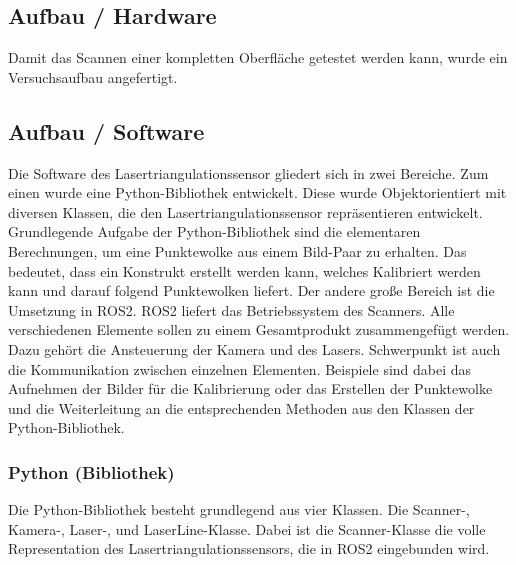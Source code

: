 	\newpage
	
	\subsection{Aufbau / Hardware}
	Damit das Scannen einer kompletten Oberfläche getestet werden kann, wurde ein Versuchsaufbau angefertigt.
	
	\label{chap:aufbau_hardware}
	
	\newpage
	
	\subsection{Aufbau / Software}
	Die Software des Lasertriangulationssensor gliedert sich in zwei Bereiche. Zum einen wurde eine Python-Bibliothek entwickelt. Diese wurde Objektorientiert mit diversen Klassen, die den Lasertriangulationssensor repräsentieren entwickelt. Grundlegende Aufgabe der Python-Bibliothek sind die elementaren Berechnungen, um eine Punktewolke aus einem Bild-Paar zu erhalten. Das bedeutet, dass ein Konstrukt erstellt werden kann, welches Kalibriert werden kann und darauf folgend Punktewolken liefert. \newline
	Der andere große Bereich ist die Umsetzung in ROS2. ROS2 liefert das Betriebssystem des Scanners. Alle verschiedenen Elemente sollen zu einem Gesamtprodukt zusammengefügt werden. Dazu gehört die Ansteuerung der Kamera und des Lasers. Schwerpunkt ist auch die Kommunikation zwischen einzelnen Elementen. Beispiele sind dabei das Aufnehmen der Bilder für die Kalibrierung oder das Erstellen der Punktewolke und die Weiterleitung an die entsprechenden Methoden aus den Klassen der Python-Bibliothek.
		\subsubsection{Python (Bibliothek)}
		Die Python-Bibliothek besteht grundlegend aus vier Klassen. Die Scanner-, Kamera-, Laser-, und LaserLine-Klasse. Dabei ist die Scanner-Klasse die volle Representation des Lasertriangulationssensors, die in ROS2 eingebunden wird.
		
